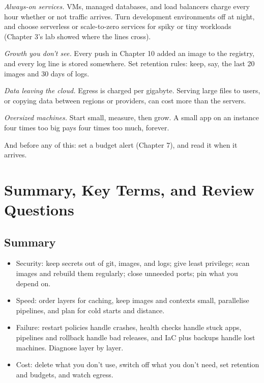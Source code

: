 \emph{Always-on services.} VMs, managed databases, and load balancers charge every hour whether or not traffic arrives. Turn development environments off at night, and choose serverless or scale-to-zero services for spiky or tiny workloads (Chapter 3's lab showed where the lines cross).

\emph{Growth you don't see.} Every push in Chapter 10 added an image to the registry, and every log line is stored somewhere. Set retention rules: keep, say, the last 20 images and 30 days of logs.

\emph{Data leaving the cloud.} Egress is charged per gigabyte. Serving large files to users, or copying data between regions or providers, can cost more than the servers.

\emph{Oversized machines.} Start small, measure, then grow. A small app on an instance four times too big pays four times too much, forever.

And before any of this: set a budget alert (Chapter 7), and read it when it arrives.

\section{Summary, Key Terms, and Review Questions}\label{12-security-speed-failure-and-cost:summary-key-terms-and-review-questions}

\subsection*{Summary}\label{12-security-speed-failure-and-cost:summary}

\begin{itemize}
\tightlist
\item
  Security: keep secrets out of git, images, and logs; give least privilege; scan images and rebuild them regularly; close unneeded ports; pin what you depend on.
\item
  Speed: order layers for caching, keep images and contexts small, parallelise pipelines, and plan for cold starts and distance.
\item
  Failure: restart policies handle crashes, health checks handle stuck apps, pipelines and rollback handle bad releases, and IaC plus backups handle lost machines. Diagnose layer by layer.
\item
  Cost: delete what you don't use, switch off what you don't need, set retention and budgets, and watch egress.
\end{itemize}

